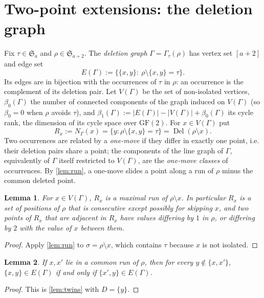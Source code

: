 \documentclass[11pt,reqno]{amsart}
\theoremstyle{plain}
\newtheorem{lemma}[lemma]{Lemma}
\theoremstyle{definition}
\theoremstyle{remark}
\newcommand{\Del}{\operatorname{Del}}
\newcommand{\Sym}{\mathfrak{S}}
\newcommand{\Gam}{\Gamma}
\newcommand{\bz}{\beta_0}
\newcommand{\bone}{\beta_1}
\begin{document}
\section{Two-point extensions: the deletion graph}\label{sec:delgraph}

Fix $\tau\in\Sym_a$ and $\rho\in\Sym_{a+2}$. The \emph{deletion graph} $\Gam=\Gam_\tau(\rho)$ has vertex set $[a+2]$ and edge set
\[
E(\Gam):=\bigl\{\{x,y\}:\ \rho\setminus\{x,y\}=\tau\bigr\}.
\]
Its edges are in bijection with the occurrences of $\tau$ in $\rho$: an occurrence is the complement of its deletion pair. Let $V(\Gam)$ be the set of non-isolated vertices, $\bz(\Gam)$ the number of connected components of the graph induced on $V(\Gam)$ (so $\bz=0$ when $\rho$ avoids $\tau$), and $\bone(\Gam):=|E(\Gam)|-|V(\Gam)|+\bz(\Gam)$ its cycle rank, the dimension of its cycle space over $\mathrm{GF}(2)$. For $x\in V(\Gam)$ put
\[
R_x:=N_\Gam(x)=\{y:\rho\setminus\{x,y\}=\tau\}=\Del(\rho\setminus x).
\]
Two occurrences are related by a \emph{one-move} if they differ in exactly one point, i.e. their deletion pairs share a point; the components of the line graph of $\Gam$, equivalently of $\Gam$ itself restricted to $V(\Gam)$, are the \emph{one-move classes} of occurrences. By \cref{lem:run}, a one-move slides a point along a run of $\rho$ minus the common deleted point.

\begin{lemma}\label{lem:Rx}
For $x\in V(\Gam)$, $R_x$ is a maximal run of $\rho\setminus x$. In particular $R_x$ is a set of positions of $\rho$ that is consecutive except possibly for skipping $x$, and two points of $R_x$ that are adjacent in $R_x$ have values differing by $1$ in $\rho$, or differing by $2$ with the value of $x$ between them.
\end{lemma}

\begin{proof}
Apply \cref{lem:run} to $\sigma=\rho\setminus x$, which contains $\tau$ because $x$ is not isolated.
\end{proof}

\begin{lemma}\label{lem:twinsG}
If $x,x'$ lie in a common run of $\rho$, then for every $y\notin\{x,x'\}$, $\{x,y\}\in E(\Gam)$ if and only if $\{x',y\}\in E(\Gam)$.
\end{lemma}

\begin{proof}
This is \cref{lem:twins} with $D=\{y\}$.
\end{proof}
\end{document}
